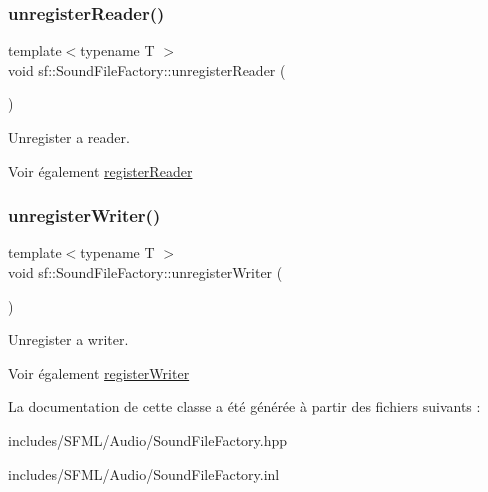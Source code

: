 \subsubsection{\texorpdfstring{unregister\+Reader()}{unregisterReader()}}
{\footnotesize\ttfamily template$<$typename T $>$ \\
void sf\+::\+Sound\+File\+Factory\+::unregister\+Reader (\begin{DoxyParamCaption}{ }\end{DoxyParamCaption})\hspace{0.3cm}{\ttfamily [static]}}



Unregister a reader. 

\begin{DoxySeeAlso}{Voir également}
\hyperlink{classsf_1_1SoundFileFactory_acaf1f0bf1b7c7b9988ec76b33e33fe95}{register\+Reader} 
\end{DoxySeeAlso}
\mbox{\label{classsf_1_1SoundFileFactory_a2306f90d1f72e474732e4bcceeb34215}} 
\subsubsection{\texorpdfstring{unregister\+Writer()}{unregisterWriter()}}
{\footnotesize\ttfamily template$<$typename T $>$ \\
void sf\+::\+Sound\+File\+Factory\+::unregister\+Writer (\begin{DoxyParamCaption}{ }\end{DoxyParamCaption})\hspace{0.3cm}{\ttfamily [static]}}



Unregister a writer. 

\begin{DoxySeeAlso}{Voir également}
\hyperlink{classsf_1_1SoundFileFactory_a3a59140e6ccf1f252f721b790eddd661}{register\+Writer} 
\end{DoxySeeAlso}


La documentation de cette classe a été générée à partir des fichiers suivants \+:\begin{DoxyCompactItemize}
\item 
includes/\+S\+F\+M\+L/\+Audio/Sound\+File\+Factory.\+hpp\item 
includes/\+S\+F\+M\+L/\+Audio/Sound\+File\+Factory.\+inl\end{DoxyCompactItemize}
